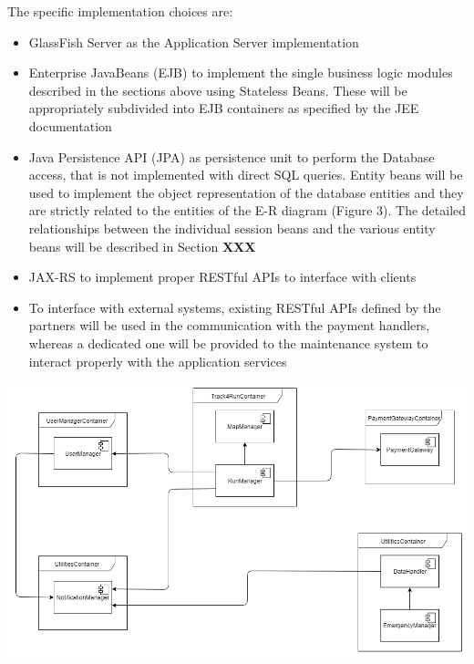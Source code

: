 The specific implementation choices are:
\begin{itemize}
\item GlassFish Server as the Application Server implementation
\item Enterprise JavaBeans (EJB) to implement the single business logic modules described in the sections above using Stateless Beans. These will be appropriately subdivided into EJB containers as specified by the JEE documentation
\item Java Persistence API (JPA) as persistence unit to perform the Database access, that is not implemented with direct SQL queries. Entity beans will be used to implement the object representation of the database entities and they are strictly related to the entities of the E-R diagram (Figure 3). The detailed relationships between the individual session beans and the various entity beans will be described in Section \textbf{XXX}
\item JAX-RS to implement proper RESTful APIs to interface with clients
\item To interface with external systems, existing RESTful APIs defined by the partners will be used in the communication with the payment handlers, whereas a dedicated one will be provided to the maintenance system to interact properly with the application services
\end{itemize}
\begin{center}
\includegraphics[scale=0.5]{sections/diagrams/component_view.png}
\newline
{}
\end{center}

